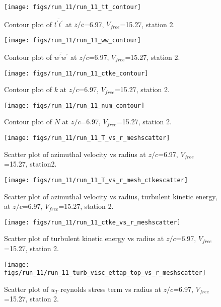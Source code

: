 \begin{figure}[H]
\centering
\texttt{[image: figs/run\_11/run\_11\_tt\_contour]}
\caption{Contour plot of $\overline{t^\prime t^\prime}$ at $z/c$=6.97, $V_{free}$=15.27, station 2.}
\end{figure}


\begin{figure}[H]
\centering
\texttt{[image: figs/run\_11/run\_11\_ww\_contour]}
\caption{Contour plot of $\overline{w^\prime w^\prime}$ at $z/c$=6.97, $V_{free}$=15.27, station 2.}
\end{figure}


\begin{figure}[H]
\centering
\texttt{[image: figs/run\_11/run\_11\_ctke\_contour]}
\caption{Contour plot of $k$ at $z/c$=6.97, $V_{free}$=15.27, station 2.}
\end{figure}


\begin{figure}[H]
\centering
\texttt{[image: figs/run\_11/run\_11\_num\_contour]}
\caption{Contour plot of $N$ at $z/c$=6.97, $V_{free}$=15.27, station 2.}
\end{figure}


\begin{figure}[H]
\centering
\texttt{[image: figs/run\_11/run\_11\_T\_vs\_r\_meshscatter]}
\caption{Scatter plot of azimuthal velocity vs radius at $z/c$=6.97, $V_{free}$=15.27, station2.}
\end{figure}


\begin{figure}[H]
\centering
\texttt{[image: figs/run\_11/run\_11\_T\_vs\_r\_mesh\_ctkescatter]}
\caption{Scatter plot of azimuthal velocity vs radius, turbulent kinetic energy, at $z/c$=6.97, $V_{free}$=15.27, station 2.}
\end{figure}


\begin{figure}[H]
\centering
\texttt{[image: figs/run\_11/run\_11\_ctke\_vs\_r\_meshscatter]}
\caption{Scatter plot of turbulent kinetic energy vs radius at $z/c$=6.97, $V_{free}$=15.27, station 2.}
\end{figure}


\begin{figure}[H]
\centering
\texttt{[image: figs/run\_11/run\_11\_turb\_visc\_ettap\_top\_vs\_r\_meshscatter]}
\caption{Scatter plot of $
u_T$ reynolds stress term vs radius at $z/c$=6.97, $V_{free}$=15.27, station 2.}
\end{figure}


